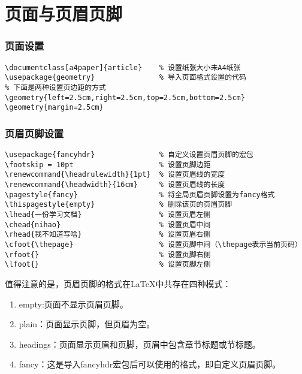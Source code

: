 \part{页面与页眉页脚}
\section{页面设置}
\begin{lstlisting}[style = LaTeX_TeXworks]
\documentclass[a4paper]{article}	% 设置纸张大小未A4纸张
\usepackage{geometry}				% 导入页面格式设置的代码
% 下面是两种设置页边距的方式
\geometry{left=2.5cm,right=2.5cm,top=2.5cm,bottom=2.5cm}
\geometry{margin=2.5cm}
\end{lstlisting}
\section{页眉页脚设置}
\begin{lstlisting}[style = LaTeX_TeXworks]
\usepackage{fancyhdr}				% 自定义设置页眉页脚的宏包
\footskip = 10pt					% 设置页脚边距
\renewcommand{\headrulewidth}{1pt}	% 设置页眉线的宽度
\renewcommand{\headwidth}{16cm}		% 设置页眉线的长度
\pagestyle{fancy}					% 将全局页眉页脚设置为fancy格式
\thispagestyle{empty}				% 删除该页的页眉页脚
\lhead{一份学习文档}					% 设置页眉左侧
\chead{nihao}						% 设置页眉中间
\rhead{我不知道写啥}					% 设置页眉右侧
\cfoot{\thepage}					% 设置页脚中间（\thepage表示当前页码）
\rfoot{}							% 设置页脚右侧
\lfoot{}							% 设置页脚左侧
\end{lstlisting}
值得注意的是，页眉页脚的格式在\LaTeX 中共存在四种模式：
\begin{enumerate}
	\item 
	empty:页面不显示页眉页脚。
	\item
	plain：页面显示页脚，但页眉为空。
	\item
	headings：页面显示页眉和页脚，页眉中包含章节标题或节标题。
	\item
	fancy：这是导入fancyhdr宏包后可以使用的格式，即自定义页眉页脚。
\end{enumerate}
